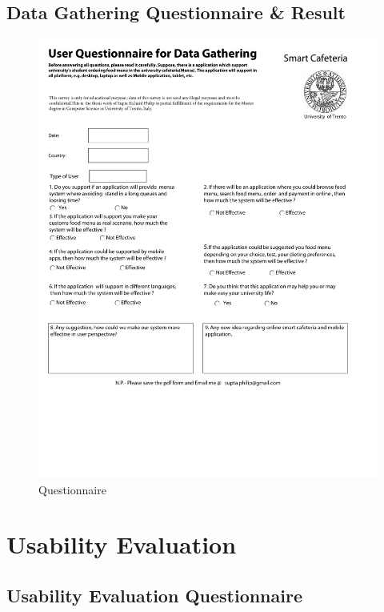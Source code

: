 \begin{appendices}
\section{Data Gathering Questionnaire \& Result}
\label{sec:DataGatheringQuestionnaire}
\begin{figure}[h!t]
    \centering
      \includegraphics[width=5.5in]{ch3/AppendixQuestionnaires/Questionnaire}
  \caption{Questionnaire}
  \label{Questionnaire}
\end{figure}

\clearpage
\newpage
\thispagestyle{empty}
\mbox{}

\chapter{Usability Evaluation}
\label{chap:UsabilityQuestionnaire}
\section{Usability Evaluation Questionnaire}
\label{sec:UsabilityEvaluationQuestionnaire}
%


\end{appendices}

